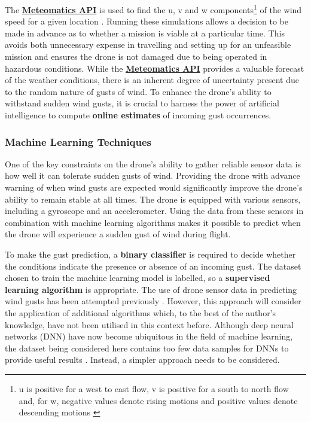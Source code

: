 The \href{https://www.meteomatics.com/}{\textbf{Meteomatics API}}  is used to find the u, v and w components\footnote{u is positive for a west to east flow, v is positive for a south to north flow and, for w, negative values denote rising motions and positive values denote descending motions \cite{meteomatics_wind_speed}} of the wind speed for a given location \cite{meteomatics_wind_speed}. Running these simulations allows a decision to be made in advance as to whether a mission is viable at a particular time. This avoids both unnecessary expense in travelling and setting up for an unfeasible mission and ensures the drone is not damaged due to being operated in hazardous conditions. While the \href{https://www.meteomatics.com/}{\textbf{Meteomatics API}}
provides a valuable forecast of the weather conditions, there is an inherent degree of uncertainty present due to the random nature of gusts of wind. To enhance the drone's ability to withstand sudden wind gusts, it is crucial to harness the power of artificial intelligence to compute \textbf{online estimates} of incoming gust occurrences. 

\subsubsection{Machine Learning Techniques}
\label{sec:mlalgos}

One of the key constraints on the drone's ability to gather reliable sensor data is how well it can tolerate sudden gusts of wind. Providing the drone with advance warning of when wind gusts are expected would significantly improve the drone's ability to remain stable at all times. The drone is equipped with various sensors, including a gyroscope and an accelerometer. Using the data from these sensors in combination with machine learning algorithms makes it possible to predict when the drone will experience a sudden gust of wind during flight.

To make the gust prediction, a \textbf{binary classifier} is required to decide whether the conditions indicate the presence or absence of an incoming gust. The dataset chosen to train the machine learning model is labelled, so a \textbf{supervised learning algorithm} is appropriate. The use of drone sensor data in predicting wind gusts has been attempted previously \cite{gu2018wind}. However, this approach will consider the application of additional algorithms which, to the best of the author's knowledge, have not been utilised in this context before. Although deep neural networks (DNN) have now become ubiquitous in the field of machine learning, the dataset being considered here contains too few data samples for DNNs to provide useful results \cite{golestaneh2024samplesneededtraindeep}. Instead, a simpler approach needs to be considered. 

